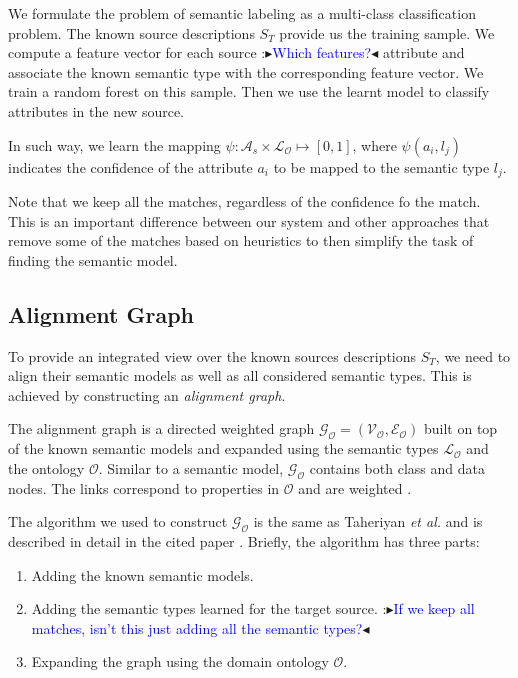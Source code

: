 \documentclass[letterpaper]{article} %
\newcommand{\authornote}[3]{
  {\fbox{\sc 
  #1}:$\blacktriangleright$\textcolor{#2}{\small{#3}}$\blacktriangleleft$}%
}
\newcommand{\ddg}[1]{\authornote{DDG}{blue}{#1}}
\newcommand{\npr}[1]{\authornote{NPR}{orange}{#1}}
\newcommand{\etal}{\textit{et al.}}
\begin{document}
We formulate the problem of semantic labeling as a multi-class classification
problem.
The known source descriptions $S_T$ provide us the training sample.
We compute a feature vector for each source \ddg{Which features?} attribute and associate the known semantic type with the corresponding feature vector. We train a random forest on this sample. 
Then we use the learnt model to classify attributes in the new
source.

In such way, we learn the mapping $\psi : \mathcal{A}_s \times \mathcal{L_O} 
\mapsto [0, 1]$,
where $\psi(a_i,l_j)$ indicates the confidence of the attribute $a_i$ to be 
mapped to the semantic type $l_j$.

Note that we keep all the matches, regardless of the confidence fo the match. 
This is an important difference between our system and other approaches 
\cite{taheriyan2016learning} that 
remove some of the matches based on heuristics to then simplify the task of 
finding the semantic model.



\subsection{Alignment Graph}

To provide an integrated view over the known sources descriptions $S_T$, we 
need to align their semantic models as well as all considered semantic 
types. This is achieved by constructing an \emph{alignment graph}. 

The alignment graph is a directed weighted graph $\mathcal{G_O} = 
(\mathcal{V_O},\mathcal{E_O})$ built on top 
of the known semantic models and expanded using the semantic types 
$\mathcal{L_O}$ and the ontology $\mathcal{O}$. Similar to a semantic 
model, $\mathcal{G_O}$ contains both class and data nodes. The links correspond 
to properties in  $\mathcal{O}$ and are weighted \cite{taheriyan2016learning}.

The algorithm we used to construct $\mathcal{G_O}$ is the same as Taheriyan 
\etal{} and is described in detail in the cited paper 
\cite{taheriyan2016learning}.
Briefly, the algorithm has three parts:
\begin{enumerate}
\item Adding the known semantic models.
\item Adding the semantic types learned for the target source. \ddg{If we keep 
all matches, isn't this just adding all the semantic types?}
\item Expanding the graph using the domain ontology $\mathcal{O}$.
\end{enumerate}
\end{document}
